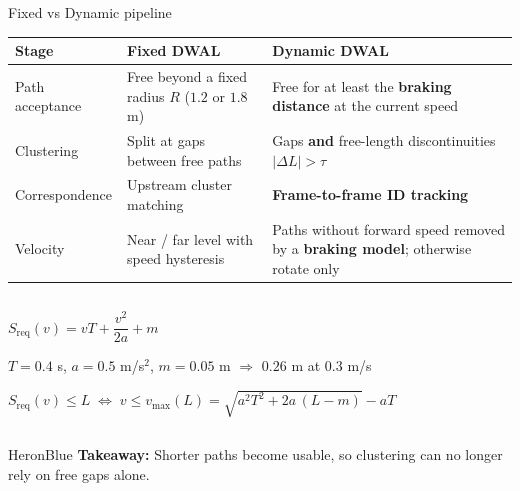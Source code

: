 \documentclass[aspectratio=169,11pt]{beamer}
\newcommand{\takeaway}[1]{%
  \begin{statusbox}{HeronBlue}
    \footnotesize\textbf{Takeaway:} #1
  \end{statusbox}
}
\begin{document}
\begin{frame}{Fixed vs Dynamic pipeline}
  \footnotesize
  \renewcommand{\arraystretch}{1.0}
  \begin{tabularx}{\textwidth}{@{}L{2.8cm}YY@{}}
    \toprule
    \textbf{Stage} & \textbf{Fixed DWAL} & \textbf{Dynamic DWAL}\\
    \midrule
    Path acceptance & Free beyond a fixed radius $R$ ($1.2$ or $1.8$ m) & Free for at least the \textbf{braking distance} at the current speed\\
    Clustering & Split at gaps between free paths & Gaps \textbf{and} free-length discontinuities $|\Delta L| > \tau$\\
    Correspondence & Upstream cluster matching & \textbf{Frame-to-frame ID tracking}\\
    Velocity & Near / far level with speed hysteresis & Paths without forward speed removed by a \textbf{braking model}; otherwise rotate only\\
    \bottomrule
  \end{tabularx}

  \vspace{0.1cm}
  \begin{columns}[c,totalwidth=\textwidth]
    \begin{column}{0.62\textwidth}
      \centering\footnotesize
      $S_{\mathrm{req}}(v) = vT + \dfrac{v^2}{2a} + m$\par
      {\scriptsize $T=0.4$ s,\; $a=0.5$ m/s$^2$,\; $m=0.05$ m \;$\Rightarrow$\; $0.26$ m at $0.3$ m/s}\par
      \vspace{0.12cm}
      $S_{\mathrm{req}}(v) \le L \;\Leftrightarrow\; v \le v_{\max}(L) = \sqrt{a^2T^2 + 2a\,(L-m)} - aT$
    \end{column}
    \begin{column}{0.36\textwidth}
      \centering
    \end{column}
  \end{columns}
  \vspace{0.05cm}
  \takeaway{Shorter paths become usable, so clustering can no longer rely on free gaps alone.}
\end{frame}
\end{document}
